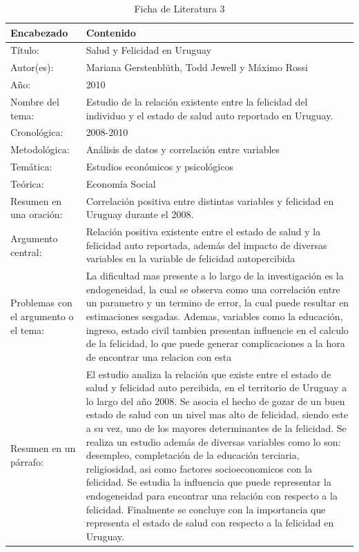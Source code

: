 \documentclass[12pt,oneside,letterpaper,spanish]{article}
\begin{document}
\newpage


\newpage
\begin{table}[H]
    \caption{Ficha de Literatura 3}
    \begin{center}
        \begin{tabular}{  m{3cm} | m{12cm}  }
        \hline\textbf{ Encabezado} & \textbf{Contenido }\\ \hline
        Título: & Salud y Felicidad en Uruguay \\ \hline
        Autor(es): & Mariana Gerstenblüth, Todd Jewell y Máximo Rossi  \\ \hline
        Año: & 2010 \\ \hline
        Nombre del tema: & Estudio de la relación existente entre la felicidad del individuo y el estado de salud auto reportado en Uruguay. \\ \hline
        Cronológica: & 2008-2010 \\ \hline
        Metodológica: & Análisis de datos y correlación entre variables \\ \hline
        Temática: & Estudios económicos y psicológicos \\ \hline
        Teórica: & Economía Social \\ \hline
        Resumen en una oración: & Correlación positiva entre distintas variables y felicidad en Uruguay durante el 2008. \\ \hline
        Argumento central: & Relación positiva existente entre el estado de salud y la felicidad auto reportada, además del impacto de diversas variables en la variable de felicidad autopercibida \\ \hline
        Problemas con el argumento o el tema: & La dificultad mas presente a lo largo de la investigación es la endogeneidad, la cual se observa como una correlación entre un parametro y un termino de error, la cual puede resultar en estimaciones sesgadas. Ademas, variables como la educación, ingreso, estado civil tambien presentan influencie en el calculo de la felicidad, lo que puede generar complicaciones a la hora de encontrar una relacion con esta  \\ \hline
        Resumen en un párrafo: & El estudio analiza la relación que existe entre el estado de salud y felicidad auto percibida, en el territorio de Uruguay a lo largo del año 2008. Se asocia el hecho de gozar de un buen estado de salud con un nivel mas alto de felicidad, siendo este a su vez, uno de los mayores determinantes de la felicidad. Se realiza un estudio además de diversas variables como lo son: desempleo, completación de la educación terciaria, religiosidad, asi como factores socioeconomicos con la felicidad. Se estudia la influencia que puede representar la endogeneidad para encontrar una relación con respecto a la felicidad. Finalmente se concluye con la importancia que representa el estado de salud con respecto a la felicidad en Uruguay.
        \\ \hline
        \end{tabular}
    \end{center}
\end{table}
\end{document}
